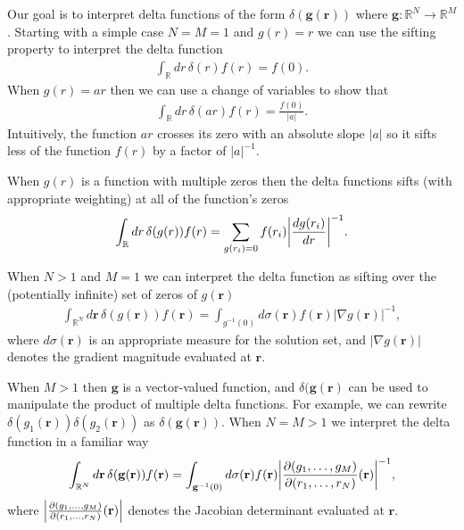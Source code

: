 \documentclass[]{osa-article}
\let\originalleft\left
\let\originalright\right
\renewcommand{\left}{\mathopen{}\mathclose\bgroup\originalleft}
\renewcommand{\right}{\aftergroup\egroup\originalright}
\providecommand{\mb}[1]{\mathbf{#1}}
\providecommand{\mbb}[1]{\mathbb{#1}}
\begin{document}
Our goal is to interpret delta functions of the form $\delta(\mb{g}(\mb{r}))$ where $\mb{g}: \mbb{R}^N \rightarrow \mbb{R}^M$. Starting with a simple case $N = M = 1$ and $g(r) = r$ we can use the sifting property to interpret the delta function
\begin{align}
  \int_{\mbb{R}}dr\,\delta(r)f(r) = f(0).
\end{align}
When $g(r) = ar$ then we can use a change of variables to show that 
\begin{align}
  \int_{\mbb{R}}dr\,\delta(ar)f(r) = \frac{f(0)}{|a|}.
\end{align}
Intuitively, the function $ar$ crosses its zero with an absolute slope $|a|$ so it sifts less of the function $f(r)$ by a factor of $|a|^{-1}$. 

When $g(r)$ is a function with multiple zeros then the delta functions sifts (with appropriate weighting) at all of the function's zeros 
\begin{align}
  \int_{\mbb{R}}dr\,\delta(g(r))f(r) = \sum_{g(r_i) = 0}f(r_i)\left|\frac{dg(r_i)}{dr}\right|^{-1}.\label{eq:zero1}
\end{align}

When $N > 1$ and $M = 1$ we can interpret the delta function as sifting over the (potentially infinite) set of zeros of $g(\mb{r})$
\begin{align}
  \int_{\mbb{R}^N}d\mb{r}\,\delta(g(\mb{r}))f(\mb{r}) = \int_{g^{-1}(0)}d\sigma(\mb{r})f(\mb{r})|\nabla g(\mb{r})|^{-1},\label{eq:zero2}
\end{align}
where $d\sigma(\mb{r})$ is an appropriate measure for the solution set, and $|\nabla g(\mb{r})|$ denotes the gradient magnitude evaluated at $\mb{r}$.

When $M > 1$ then $\mb{g}$ is a vector-valued function, and $\delta(\mb{g}(\mb{r})$ can be used to manipulate the product of multiple delta functions. For example, we can rewrite $\delta(g_1(\mb{r}))\delta(g_2(\mb{r}))$ as $\delta(\mb{g}(\mb{r}))$. When $N = M > 1$ 
we interpret the delta function in a familiar way
\begin{align}
  \int_{\mbb{R}^N}d\mb{r}\,\delta(\mb{g}(\mb{r}))f(\mb{r}) = \int_{\mb{g}^{-1}(0)}d\sigma(\mb{r})f(\mb{r})\left|\frac{\partial(g_1,\dots,g_M)}{\partial(r_1,\dots,r_N)}(\mb{r})\right|^{-1},
\end{align}
where $\left|\frac{\partial(g_1,\dots,g_M)}{\partial(r_1,\dots,r_N)}(\mb{r})\right|$ denotes the Jacobian determinant evaluated at $\mb{r}$.
\end{document}
